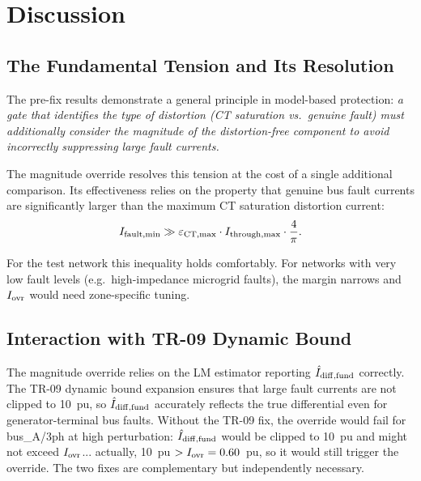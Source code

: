 \documentclass[12pt,a4paper]{article}
\begin{document}
\section{Discussion}

\subsection{The Fundamental Tension and Its Resolution}

The pre-fix results demonstrate a general principle in model-based
protection: \emph{a gate that identifies the type of distortion
(CT saturation vs.\ genuine fault) must additionally consider the
magnitude of the distortion-free component to avoid incorrectly
suppressing large fault currents.}

The magnitude override resolves this tension at the cost of a single
additional comparison.  Its effectiveness relies on the property that
genuine bus fault currents are significantly larger than the maximum
CT saturation distortion current:
\begin{equation}
  I_{\rm fault,min} \gg \varepsilon_{\rm CT,max} \cdot I_{\rm through,max} \cdot \frac{4}{\pi}.
\end{equation}

For the test network this inequality holds comfortably.  For networks
with very low fault levels (e.g.\ high-impedance microgrid faults),
the margin narrows and $I_{\rm ovr}$ would need zone-specific tuning.

\subsection{Interaction with TR-09 Dynamic Bound}

The magnitude override relies on the LM estimator reporting
$\hat{I}_{\rm diff,fund}$ correctly.  The TR-09 dynamic bound expansion
ensures that large fault currents are not clipped to 10~pu, so
$\hat{I}_{\rm diff,fund}$ accurately reflects the true differential even
for generator-terminal bus faults.  Without the TR-09 fix, the override
would fail for bus\_A/3ph at high perturbation: $\hat{I}_{\rm diff,fund}$
would be clipped to 10~pu and might not exceed $I_{\rm ovr}$... actually,
10~pu $> I_{\rm ovr} = 0.60$~pu, so it would still trigger the override.
The two fixes are complementary but independently necessary.
\end{document}
